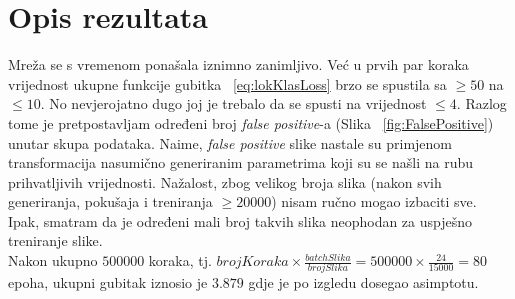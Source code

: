 \section{Opis rezultata}
Mreža se s vremenom ponašala iznimno zanimljivo.
Već u prvih par koraka vrijednost ukupne funkcije gubitka ~\ref{eq:lokKlasLoss} brzo se spustila sa $\geq 50$ na $\leq 10$.
No nevjerojatno dugo joj je trebalo da se spusti na vrijednost $\leq 4$.
Razlog tome je pretpostavljam određeni broj \emph{false positive}-a (Slika ~\ref{fig:FalsePositive}) unutar skupa podataka.
Naime, \emph{false positive} slike nastale su primjenom transformacija nasumično generiranim parametrima koji su se našli na rubu prihvatljivih vrijednosti.
Nažalost, zbog velikog broja slika (nakon svih generiranja, pokušaja i treniranja $\geq 20000$) nisam ručno mogao izbaciti sve.
Ipak, smatram da je određeni mali broj takvih slika neophodan za uspješno treniranje slike. \\
Nakon ukupno $500 000$ koraka, tj. $brojKoraka \times \frac{batchSlika}{brojSlika} = 500000 \times \frac{24}{15000} = 80$ epoha,  ukupni gubitak iznosio je $3.879$ gdje je po izgledu dosegao asimptotu.
